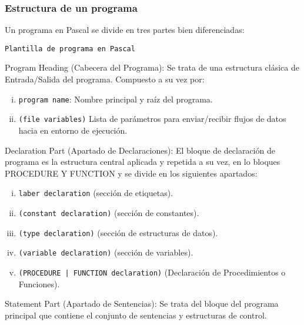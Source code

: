 \begin{enumerate}[I.]
\begin{enumerate}[i.]
\end{enumerate}

\end{enumerate}

\subsubsection{Estructura de un programa}

Un programa en Pascal se divide en tres partes bien diferenciadas:

\prog \texttt{Plantilla de programa en Pascal}



\begin{enumerate}[I.]
{
\item {}Program Heading (Cabecera del Programa): Se trata de una estructura clásica de Entrada/Salida del programa. Compuesto a su vez por:
{
\begin{enumerate}[i.]

\item \texttt{program name}: Nombre principal y raíz del programa. 

\item \texttt{(file variables)} Lista de parámetros para enviar/recibir flujos de datos hacia en entorno de ejecución.

\end{enumerate}
}
\item {}Declaration Part (Apartado de Declaraciones): El bloque de declaración de programa es la estructura central aplicada y repetida a su vez, en lo bloques PROCEDURE Y FUNCTION y se divide en los siguientes apartados:
{
\begin{enumerate}[i.]

\item \texttt{laber declaration} (sección de etiquetas).

\item \texttt{(constant declaration)} (sección de constantes).

\item \texttt{(type declaration)} (sección de estructuras de datos).

\item \texttt{(variable declaration)} (sección de variables).

\item \texttt{(PROCEDURE | FUNCTION declaration)} (Declaración de Procedimientos o Funciones).

\end{enumerate}
}

\item {}Statement Part (Apartado de Sentencias): Se trata del bloque del programa principal que contiene el conjunto de sentencias y estructuras de control.



}
\end{enumerate}

